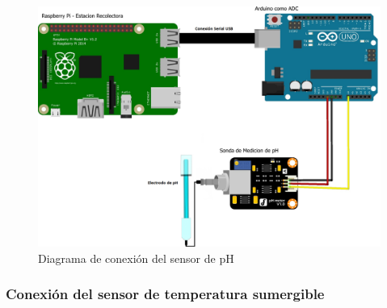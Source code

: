         \begin{figure}[h]
            \centering
            \includegraphics[scale=0.25]{hardware/DiagramaSensordepH_bb2.jpg}
            \caption{Diagrama de conexión del sensor de pH}
            \label{fig:ConexionSensorpH}
        \end{figure}

    \subsubsection{Conexión del sensor de temperatura sumergible}

